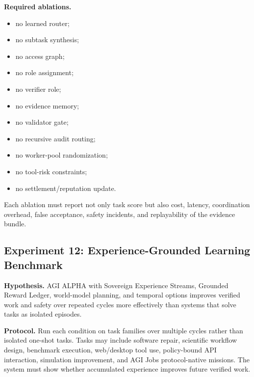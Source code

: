 \documentclass[11pt]{article}
\providecommand{\tightlist}{\setlength{\itemsep}{0pt}\setlength{\parskip}{0pt}}
\begin{document}
\textbf{Required ablations.}

\begin{itemize}
\tightlist
\item
  no learned router;
\item
  no subtask synthesis;
\item
  no access graph;
\item
  no role assignment;
\item
  no verifier role;
\item
  no evidence memory;
\item
  no validator gate;
\item
  no recursive audit routing;
\item
  no worker-pool randomization;
\item
  no tool-risk constraints;
\item
  no settlement/reputation update.
\end{itemize}

Each ablation must report not only task score but also cost, latency,
coordination overhead, false acceptance, safety incidents, and
replayability of the evidence bundle.

\subsection{Experiment 12: Experience-Grounded Learning
Benchmark}\label{experiment-12-experience-grounded-learning-benchmark}

\textbf{Hypothesis.} AGI ALPHA with Sovereign Experience Streams,
Grounded Reward Ledger, world-model planning, and temporal options
improves verified work and safety over repeated cycles more effectively
than systems that solve tasks as isolated episodes.

\textbf{Protocol.} Run each condition on task families over multiple
cycles rather than isolated one-shot tasks. Tasks may include software
repair, scientific workflow design, benchmark execution, web/desktop
tool use, policy-bound API interaction, simulation improvement, and AGI
Jobs protocol-native missions. The system must show whether accumulated
experience improves future verified work.
\end{document}
